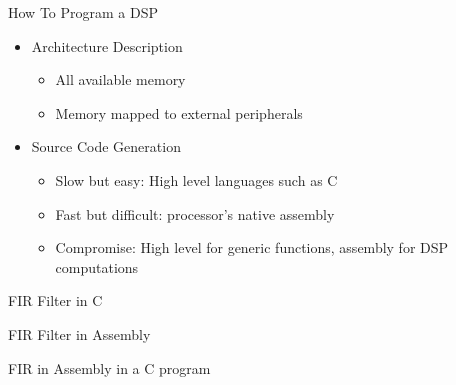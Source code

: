 \documentclass{beamer}
\begin{document}
\begin{frame}{How To Program a DSP}
    \begin{itemize}
        \item Architecture Description
            \begin{itemize}
                \item All available memory
                \item Memory mapped to external peripherals
            \end{itemize}
        \item Source Code Generation
            \begin{itemize}
                \item Slow but easy: High level languages such as C
                \item Fast but difficult: processor's native assembly
                \item Compromise: High level for generic functions, assembly for DSP computations
            \end{itemize}
    \end{itemize}
\end{frame}

\begin{frame}{FIR Filter in C}
    \begin{center}
        {\tiny
            
        }
    \end{center}
\end{frame}

\begin{frame}{FIR Filter in Assembly}
    \begin{center}
        {\tiny
            
        }
    \end{center}
\end{frame}

\begin{frame}{FIR in Assembly in a C program}
    \begin{center}
        {\tiny
            
        }
    \end{center}
\end{frame}
\end{document}
